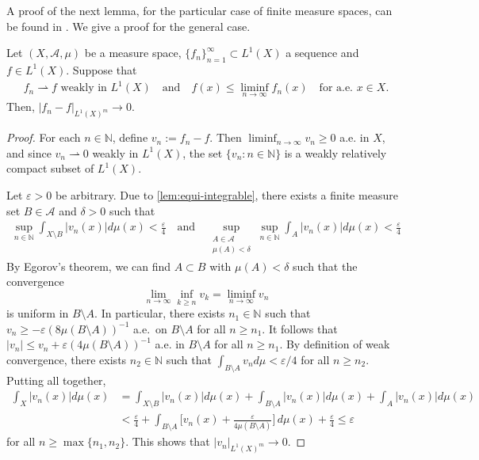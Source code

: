 \documentclass[hidelinks,onefignum,onetabnum]{siamart220329}
\begin{document}
 A proof of the next lemma, for the particular case of finite measure spaces, can be found in \cite[Proposition 2.3.38]{NonlinearAnalysis}. We give a proof for the general case.
\begin{lemma}\label{lem:weak_gives_strong_nonneg}
	Let $(X,\mathcal A,\mu)$ be a measure space,  $\{f_n\}_{n=1}^\infty \subset {L^1(X)}$ a sequence and  $f\in {L^1(X)}$. Suppose that 
	\begin{align*}
	f_n\rightharpoonup f\text{ weakly in ${L^1(X)}$}\quad\text{and}\quad	f(x)\le\liminf_{n\to\infty}f_{n}(x)\quad\text{for a.e. $x\in X$.}
	\end{align*}
	Then, $|f_n-f|_{{L^1(X)^m}}\to0$.
\end{lemma}
\begin{proof}
	For each $n\in\mathbb N$, define $v_n:=f_n-f$.  Then $\liminf_{n\to\infty} v_n\ge0$ a.e. in $X$, and since $v_n\rightharpoonup 0$ weakly in ${L^1(X)}$, the set $\{v_{n}: n\in\mathbb N\}$ is a weakly relatively compact subset of ${L^1(X)}$. 
	
	Let $\varepsilon > 0$ be arbitrary. Due to \cref{lem:equi-integrable},
	there exists a finite measure set $B \in\mathcal A$  and $\delta>0$ such that
	\begin{align*}
		\sup_{n\in\mathbb N} \int_{X \setminus B} |v_n(x)| d\mu(x)< \frac{\varepsilon}{4}\quad\text{and}\quad \sup_{\substack{A\in\mathcal A \\ \mu(A)<\delta}}\sup_{n\in\mathbb N} \int_{A} |v_n(x)| d\mu(x) < \frac{\varepsilon}{4}
	\end{align*}
	By Egorov's theorem, we can find $A \subset B$ with $\mu(A)<\delta$ such that the convergence
	\begin{equation*}
		\lim_{n \to \infty} \inf_{k \ge n} v_k
		=
		\liminf_{n \to \infty} v_n
	\end{equation*}
	is uniform in $B \setminus A$. 	In particular, there exists $n_1\in \mathbb N$
	such that
	$v_n\ge -\varepsilon (8\mu(B \setminus A))^{-1}$
	a.e.\ on $B \setminus A$ for all $n\ge n_1$.
	It follows that
	${|v_n|} \le v_n + \varepsilon(4\mu(B \setminus A))^{-1}$ a.e. in $B \setminus A$ for all $n\ge n_1$.
	By definition of weak convergence,
	there exists $n_2\in\mathbb N$ such that
	$\int_{B \setminus A} v_n d \mu < \varepsilon/4$
	for all $n \ge n_2$.
	Putting all together, 
	\begin{align*}
		\int_X {|v_n(x)|} d\mu(x)
		&=
		\int_{X \setminus B} {|v_n(x)|} d\mu(x)
		+
		\int_{B \setminus A} {|v_n(x)|} d\mu(x)+
		\int_A {|v_n(x)|} d\mu(x)\\
		&<\frac{\varepsilon}{4}
		+
		\int_{B \setminus A}\Big[v_n(x)+\frac{\varepsilon}{4\mu(B\setminus A)}\Big]\,d\mu(x)	+\frac{\varepsilon}{4}\le\varepsilon
	\end{align*}
	 for all $n \ge\max\{n_1,n_2\}$. This shows that  $|v_n|_{{L^1(X)^m}} \to 0$.
\end{proof}
\end{document}
